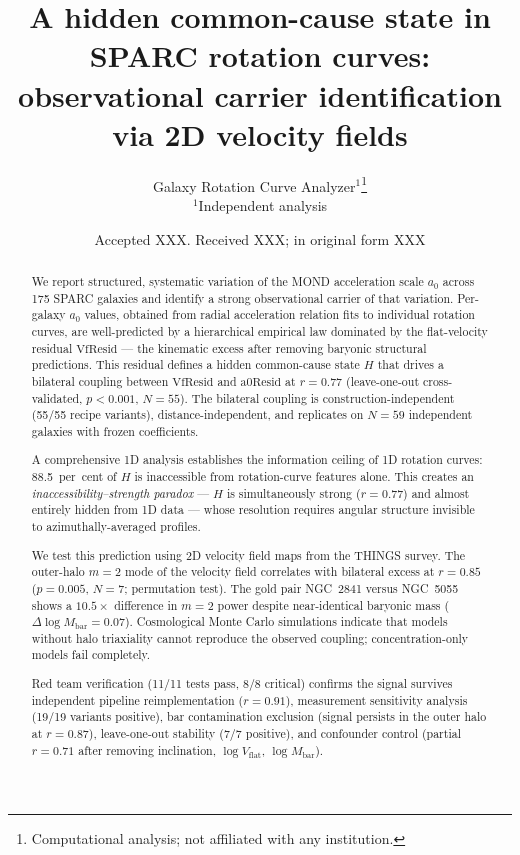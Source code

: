 \documentclass[fleqn,usenatbib]{mnras}
\title[Hidden state in SPARC rotation curves]{A hidden common-cause state in SPARC rotation curves: observational carrier identification via 2D velocity fields}
\author[Galaxy Rotation Curve Analyzer]{
Galaxy Rotation Curve Analyzer$^{1}$\thanks{Computational analysis; not affiliated with any institution.}
\\
$^{1}$Independent analysis
}
\date{Accepted XXX. Received XXX; in original form XXX}
\newcommand{\vflat}{V_\mathrm{flat}}
\newcommand{\azero}{a_0}
\newcommand{\vfresid}{\mathrm{VfResid}}
\newcommand{\aresid}{\mathrm{a0Resid}}
\newcommand{\mtwo}{m{=}2}
\begin{document}
\label{firstpage}
\pagerange{\pageref{firstpage}--\pageref{lastpage}}
\maketitle

\begin{abstract}
We report structured, systematic variation of the MOND acceleration scale $\azero$ across 175 SPARC galaxies and identify a strong observational carrier of that variation.
Per-galaxy $\azero$ values, obtained from radial acceleration relation fits to individual rotation curves, are well-predicted by a hierarchical empirical law dominated by the flat-velocity residual $\vfresid$ --- the kinematic excess after removing baryonic structural predictions.
This residual defines a hidden common-cause state $H$ that drives a bilateral coupling between $\vfresid$ and $\aresid$ at $r = 0.77$ (leave-one-out cross-validated, $p < 0.001$, $N = 55$).
The bilateral coupling is construction-independent (55/55 recipe variants), distance-independent, and replicates on $N = 59$ independent galaxies with frozen coefficients.

A comprehensive 1D analysis establishes the information ceiling of 1D rotation curves: 88.5~per~cent of $H$ is inaccessible from rotation-curve features alone.
This creates an \emph{inaccessibility--strength paradox} --- $H$ is simultaneously strong ($r = 0.77$) and almost entirely hidden from 1D data --- whose resolution requires angular structure invisible to azimuthally-averaged profiles.

We test this prediction using 2D velocity field maps from the THINGS survey.
The outer-halo $\mtwo$ mode of the velocity field correlates with bilateral excess at $r = 0.85$ ($p = 0.005$, $N = 7$; permutation test).
The gold pair NGC~2841 versus NGC~5055 shows a $10.5\times$ difference in $\mtwo$ power despite near-identical baryonic mass ($\Delta\log M_\mathrm{bar} = 0.07$).
Cosmological Monte Carlo simulations indicate that models without halo triaxiality cannot reproduce the observed coupling; concentration-only models fail completely.

Red team verification (11/11 tests pass, 8/8 critical) confirms the signal survives independent pipeline reimplementation ($r = 0.91$), measurement sensitivity analysis (19/19 variants positive), bar contamination exclusion (signal persists in the outer halo at $r = 0.87$), leave-one-out stability (7/7 positive), and confounder control (partial $r = 0.71$ after removing inclination, $\log\vflat$, $\log M_\mathrm{bar}$).


\end{abstract}
\end{document}
